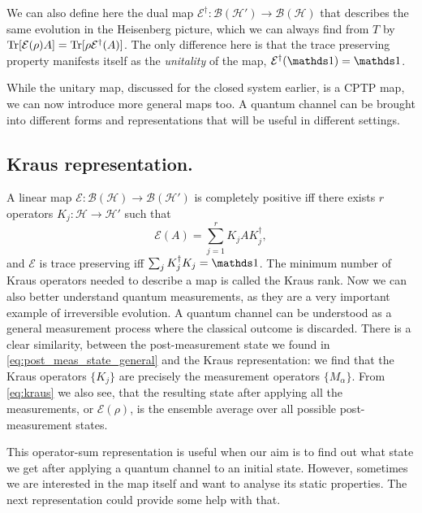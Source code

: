 We can also define here the dual map $\mathcal{E}^\dagger : \mathcal{B}(\mathcal{H'})\rightarrow \mathcal{B}(\mathcal{H})$ that describes the same evolution in the Heisenberg picture, which we can always find from $T$ by $\operatorname{Tr}[\mathcal{E}(\rho) A] = \operatorname{Tr}[\rho \mathcal{E}^\dagger(A)]$. The only difference here is that the trace preserving property manifests itself as the \textit{unitality} of the map, $\mathcal{E}^\dagger(\idm) = \idm$.

While the unitary map, discussed for the closed system earlier, is a CPTP map, we can now introduce more general maps too. A quantum channel can be brought into different forms and representations that will be useful in different settings. 

\smallskip
\subsection{Kraus representation.} A linear map $\mathcal{E}: \mathcal{B}(\mathcal{H}) \rightarrow \mathcal{B}(\mathcal{H}')$ is completely positive iff there exists $r$ operators $K_j: \mathcal{H}\rightarrow\mathcal{H}'$ such that
\begin{equation}
    \label{eq:kraus}
    \mathcal{E}(A) = \sum_{j=1}^r K_j A K_j^\dagger,
\end{equation}
and $\mathcal{E}$ is trace preserving iff $\sum_j K_j^\dagger K_j = \idm$. The minimum number of Kraus operators needed to describe a map is called the Kraus rank. 
Now we can also better understand quantum measurements, as they are a very important example of irreversible evolution. A quantum channel can be understood as a general measurement process where the classical outcome is discarded. There is a clear similarity, between the post-measurement state we found in \eqref{eq:post_meas_state_general} and the Kraus representation: we find that the Kraus operators $\{K_j\}$ are precisely the measurement operators $\{M_\alpha\}$. From \eqref{eq:kraus} we also see, that the resulting state after applying all the measurements, or $\mathcal{E}(\rho)$, is the ensemble average over all possible post-measurement states.

This operator-sum representation is useful when our aim is to find out what state we get after applying a quantum channel to an initial state. However, sometimes we are interested in the map itself and want to analyse its static properties. The next representation could provide some help with that. 

\smallskip
{}
